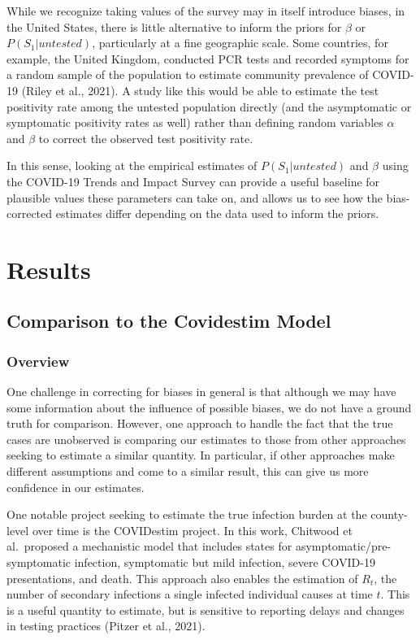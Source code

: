 \documentclass[12pt,twoside]{smiththesis}
\begin{document}
While we recognize taking values of the survey may in itself introduce biases, in the United States, there is little alternative to inform the priors for \(\beta\) or \(P(S_1|untested)\), particularly at a fine geographic scale. Some countries, for example, the United Kingdom, conducted PCR tests and recorded symptoms for a random sample of the population to estimate community prevalence of COVID-19 (Riley et al., 2021). A study like this would be able to estimate the test positivity rate among the untested population directly (and the asymptomatic or symptomatic positivity rates as well) rather than defining random variables \(\alpha\) and \(\beta\) to correct the observed test positivity rate.

In this sense, looking at the empirical estimates of \(P(S_1|untested)\) and \(\beta\) using the COVID-19 Trends and Impact Survey can provide a useful baseline for plausible values these parameters can take on, and allows us to see how the bias-corrected estimates differ depending on the data used to inform the priors.

\hypertarget{res}{%
\chapter{Results}\label{res}}

\hypertarget{comparison-to-the-covidestim-model}{%
\section{Comparison to the Covidestim Model}\label{comparison-to-the-covidestim-model}}

\hypertarget{overview-2}{%
\subsection{Overview}\label{overview-2}}

One challenge in correcting for biases in general is that although we may have some information about the influence of possible biases, we do not have a ground truth for comparison. However, one approach to handle the fact that the true cases are unobserved is comparing our estimates to those from other approaches seeking to estimate a similar quantity. In particular, if other approaches make different assumptions and come to a similar result, this can give us more confidence in our estimates.

One notable project seeking to estimate the true infection burden at the county-level over time is the COVIDestim project. In this work, Chitwood et al.~proposed a mechanistic model that includes states for asymptomatic/pre-symptomatic infection, symptomatic but mild infection, severe COVID-19 presentations, and death. This approach also enables the estimation of \(R_t\), the number of secondary infections a single infected individual causes at time \(t\). This is a useful quantity to estimate, but is sensitive to reporting delays and changes in testing practices (Pitzer et al., 2021).
\end{document}
